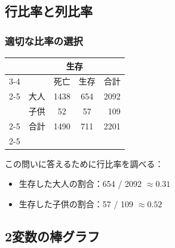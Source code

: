 
\subsection{行比率と列比率}


\begin{frame}
\frametitle{適切な比率の選択}


\begin{center}
\begin{tabular}{l l cc r}
                               &          & \multicolumn{2}{c}{{生存}} \\
  \cline{3-4}
                               &          & 死亡   & 生存   & 合計 \\
  \cline{2-5}
\multirow{2}{*}{{年齢}}& 大人 & 1438  & 654      & 2092 \\
                               & 子供 & 52    & 57        & 109\\
  \cline{2-5}
                               & 合計 & 1490  & 711      &  2201 \\
  \cline{2-5}
\end{tabular}
\end{center}

この問いに答えるために行比率を調べる：

\begin{itemize}

\item 生存した大人の割合：654 / 2092 $\approx 0.31$ \\

\item 生存した子供の割合：57 / 109 $\approx 0.52$ \\

\end{itemize}

\end{frame}


\subsection{2変数の棒グラフ}


